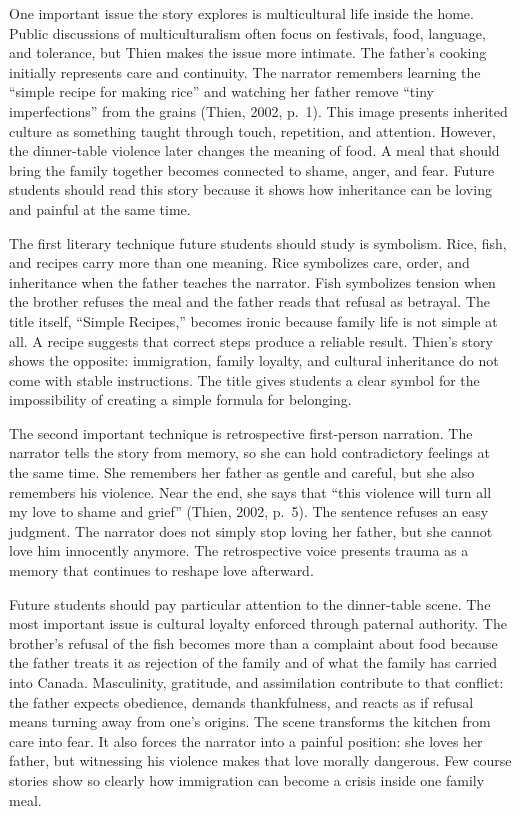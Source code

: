 \documentclass[12pt]{article}
\begin{document}
One important issue the story explores is multicultural life inside the home. Public discussions of multiculturalism often focus on festivals, food, language, and tolerance, but Thien makes the issue more intimate. The father's cooking initially represents care and continuity. The narrator remembers learning the ``simple recipe for making rice'' and watching her father remove ``tiny imperfections'' from the grains (Thien, 2002, p.~1). This image presents inherited culture as something taught through touch, repetition, and attention. However, the dinner-table violence later changes the meaning of food. A meal that should bring the family together becomes connected to shame, anger, and fear. Future students should read this story because it shows how inheritance can be loving and painful at the same time.

The first literary technique future students should study is symbolism. Rice, fish, and recipes carry more than one meaning. Rice symbolizes care, order, and inheritance when the father teaches the narrator. Fish symbolizes tension when the brother refuses the meal and the father reads that refusal as betrayal. The title itself, ``Simple Recipes,'' becomes ironic because family life is not simple at all. A recipe suggests that correct steps produce a reliable result. Thien's story shows the opposite: immigration, family loyalty, and cultural inheritance do not come with stable instructions. The title gives students a clear symbol for the impossibility of creating a simple formula for belonging.

The second important technique is retrospective first-person narration. The narrator tells the story from memory, so she can hold contradictory feelings at the same time. She remembers her father as gentle and careful, but she also remembers his violence. Near the end, she says that ``this violence will turn all my love to shame and grief'' (Thien, 2002, p.~5). The sentence refuses an easy judgment. The narrator does not simply stop loving her father, but she cannot love him innocently anymore. The retrospective voice presents trauma as a memory that continues to reshape love afterward.

Future students should pay particular attention to the dinner-table scene. The most important issue is cultural loyalty enforced through paternal authority. The brother's refusal of the fish becomes more than a complaint about food because the father treats it as rejection of the family and of what the family has carried into Canada. Masculinity, gratitude, and assimilation contribute to that conflict: the father expects obedience, demands thankfulness, and reacts as if refusal means turning away from one's origins. The scene transforms the kitchen from care into fear. It also forces the narrator into a painful position: she loves her father, but witnessing his violence makes that love morally dangerous. Few course stories show so clearly how immigration can become a crisis inside one family meal.
\end{document}
